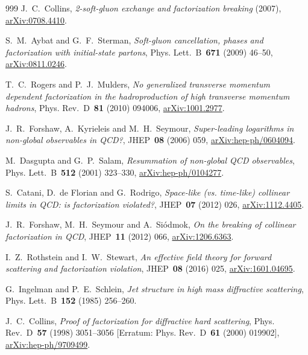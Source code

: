 \begin{thebibliography}{999}
J.~C.~Collins, \emph{2-soft-gluon exchange and factorization breaking} (2007), \href{https://arxiv.org/abs/0708.4410}{arXiv:0708.4410}.

S.~M.~Aybat and G.~F.~Sterman, \emph{Soft-gluon cancellation, phases and factorization with initial-state partons}, Phys. Lett.~B~\textbf{671} (2009) \mbox{46--50}, \href{https://arxiv.org/abs/0811.0246}{arXiv:0811.0246}.

T.~C.~Rogers and P.~J.~Mulders, \emph{No generalized transverse momentum dependent factorization in the hadroproduction of high transverse momentum hadrons}, Phys. Rev.~D~\textbf{81} (2010) \mbox{094006}, \href{https://arxiv.org/abs/1001.2977}{arXiv:1001.2977}.

J.~R.~Forshaw, A.~Kyrieleis and M.~H.~Seymour, \emph{Super-leading logarithms in non-global observables in QCD?}, JHEP~\textbf{08} (2006) \mbox{059}, \href{https://arxiv.org/abs/hep-ph/0604094}{arXiv:hep-ph/0604094}.

M.~Dasgupta and G.~P.~Salam, \emph{Resummation of non-global QCD observables}, Phys. Lett.~B~\textbf{512} (2001) \mbox{323--330}, \href{https://arxiv.org/abs/hep-ph/0104277}{arXiv:hep-ph/0104277}.

S.~Catani, D.~de Florian and G.~Rodrigo, \emph{Space-like (vs. time-like) collinear limits in QCD: is factorization violated?}, JHEP~\textbf{07} (2012) \mbox{026}, \href{https://arxiv.org/abs/1112.4405}{arXiv:1112.4405}.

J.~R.~Forshaw, M.~H.~Seymour and A.~Siódmok, \emph{On the breaking of collinear factorization in QCD}, JHEP~\textbf{11} (2012) \mbox{066}, \href{https://arxiv.org/abs/1206.6363}{arXiv:1206.6363}.

I.~Z.~Rothstein and I.~W.~Stewart, \emph{An effective field theory for forward scattering and factorization violation}, JHEP~\textbf{08} (2016) \mbox{025}, \href{https://arxiv.org/abs/1601.04695}{arXiv:1601.04695}.

G.~Ingelman and P.~E.~Schlein, \emph{Jet structure in high mass diffractive scattering}, Phys. Lett.~B~\textbf{152} (1985) \mbox{256--260}.

J.~C.~Collins, \emph{Proof of factorization for diffractive hard scattering}, Phys. Rev.~D~\textbf{57} (1998) \mbox{3051--3056} [Erratum: Phys. Rev.~D~\textbf{61} (2000) \mbox{019902}], \href{https://arxiv.org/abs/hep-ph/9709499}{arXiv:hep-ph/9709499}.


\end{thebibliography}
